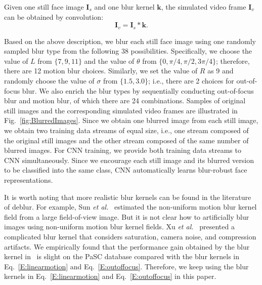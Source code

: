 \documentclass[10pt,journal,cspaper,compsoc]{IEEEtran}
\begin{document}
Given one still face image $\mathbf{I}_{s}$ and one blur kernel $\mathbf{k}$, the simulated video frame $\mathbf{I}_{v}$ can be obtained by convolution:
\begin{equation}
\label{E:simpleform}
\mathbf{I}_{v}=\mathbf{I}_{s}*\mathbf{k}.
\end{equation}

Based on the above description, we blur each still face image using one randomly sampled blur type from the following 38 possibilities.
Specifically, we choose the value of $L$ from $\{7,9,11\}$ and the value of $\theta$ from $\{0, \pi/4, \pi/2, 3\pi/4\}$;
therefore, there are 12 motion blur choices.
Similarly, we set the value of $R$ as 9 and randomly choose the value of $\sigma$ from $\{1.5,3.0\}$; i.e., there are 2 choices for out-of-focus blur.
We also enrich the blur types by sequentially conducting out-of-focus blur and motion blur, of which there are 24 combinations.
Samples of original still images and the corresponding simulated video frames are illustrated in Fig.~\ref{fig:BlurredImages}.
Since we obtain one blurred image from each still image, we obtain two training data streams of equal size,
i.e., one stream composed of the original still images and the other stream composed of the same number of blurred images.
For CNN training, we provide both training data streams to CNN simultaneously.
Since we encourage each still image and its blurred version to be classified into the same class, CNN automatically learns blur-robust face representations.

It is worth noting that more realistic blur kernels can be found in the literature of deblur.
For example, Sun \textit{et al.}~\cite{sun2015learning} estimated the non-uniform motion blur kernel field from a large field-of-view image.
But it is not clear how to artificially blur images using non-uniform motion blur kernel fields.
Xu \textit{et al.}~\cite{xu2014deep} presented a complicated blur kernel that considers saturation, camera noise, and compression artifacts.
We empirically found that the performance gain obtained by the blur kernel in~\cite{xu2014deep} is slight on the PaSC database compared with the blur kernels in Eq.~\ref{E:linearmotion} and Eq.~\ref{E:outoffocus}. Therefore, we keep using the blur kernels in Eq.~\ref{E:linearmotion} and Eq.~\ref{E:outoffocus} in this paper.
\end{document}
